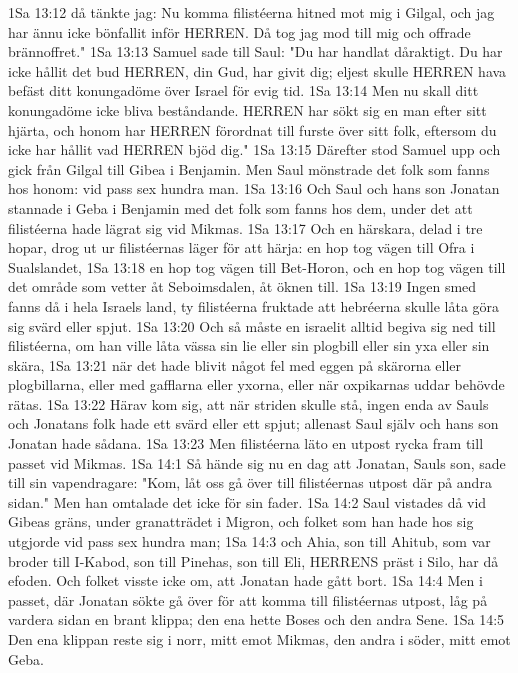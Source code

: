1Sa 13:12  då tänkte jag: Nu komma filistéerna hitned mot mig i Gilgal, och jag har ännu icke bönfallit inför HERREN. Då tog jag mod till mig och offrade brännoffret."
1Sa 13:13  Samuel sade till Saul: "Du har handlat dåraktigt. Du har icke hållit det bud HERREN, din Gud, har givit dig; eljest skulle HERREN hava befäst ditt konungadöme över Israel för evig tid.
1Sa 13:14  Men nu skall ditt konungadöme icke bliva beståndande. HERREN har sökt sig en man efter sitt hjärta, och honom har HERREN förordnat till furste över sitt folk, eftersom du icke har hållit vad HERREN bjöd dig."
1Sa 13:15  Därefter stod Samuel upp och gick från Gilgal till Gibea i Benjamin. Men Saul mönstrade det folk som fanns hos honom: vid pass sex hundra man.
1Sa 13:16  Och Saul och hans son Jonatan stannade i Geba i Benjamin med det folk som fanns hos dem, under det att filistéerna hade lägrat sig vid Mikmas.
1Sa 13:17  Och en härskara, delad i tre hopar, drog ut ur filistéernas läger för att härja: en hop tog vägen till Ofra i Sualslandet,
1Sa 13:18  en hop tog vägen till Bet-Horon, och en hop tog vägen till det område som vetter åt Seboimsdalen, åt öknen till.
1Sa 13:19  Ingen smed fanns då i hela Israels land, ty filistéerna fruktade att hebréerna skulle låta göra sig svärd eller spjut.
1Sa 13:20  Och så måste en israelit alltid begiva sig ned till filistéerna, om han ville låta vässa sin lie eller sin plogbill eller sin yxa eller sin skära,
1Sa 13:21  när det hade blivit något fel med eggen på skärorna eller plogbillarna, eller med gafflarna eller yxorna, eller när oxpikarnas uddar behövde rätas.
1Sa 13:22  Härav kom sig, att när striden skulle stå, ingen enda av Sauls och Jonatans folk hade ett svärd eller ett spjut; allenast Saul själv och hans son Jonatan hade sådana.
1Sa 13:23  Men filistéerna läto en utpost rycka fram till passet vid Mikmas.
1Sa 14:1  Så hände sig nu en dag att Jonatan, Sauls son, sade till sin vapendragare: "Kom, låt oss gå över till filistéernas utpost där på andra sidan." Men han omtalade det icke för sin fader.
1Sa 14:2  Saul vistades då vid Gibeas gräns, under granatträdet i Migron, och folket som han hade hos sig utgjorde vid pass sex hundra man;
1Sa 14:3  och Ahia, son till Ahitub, som var broder till I-Kabod, son till Pinehas, son till Eli, HERRENS präst i Silo, har då efoden. Och folket visste icke om, att Jonatan hade gått bort.
1Sa 14:4  Men i passet, där Jonatan sökte gå över för att komma till filistéernas utpost, låg på vardera sidan en brant klippa; den ena hette Boses och den andra Sene.
1Sa 14:5  Den ena klippan reste sig i norr, mitt emot Mikmas, den andra i söder, mitt emot Geba.
